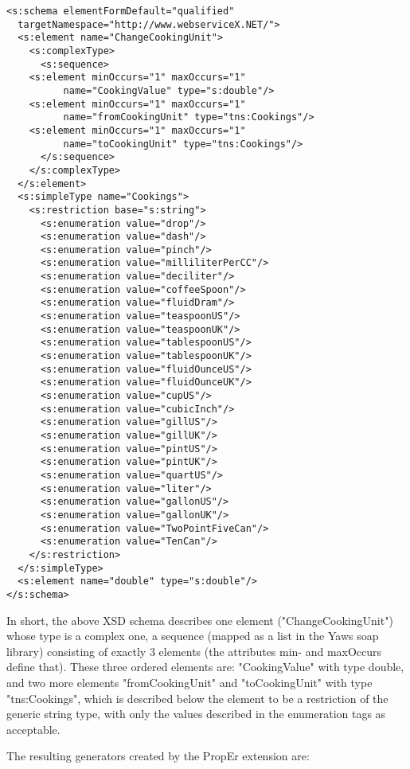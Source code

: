 \documentclass[11pt]{article} %
\begin{document}
\begin{lstlisting}
<s:schema elementFormDefault="qualified"
  targetNamespace="http://www.webserviceX.NET/">
  <s:element name="ChangeCookingUnit">
    <s:complexType>
      <s:sequence>
	<s:element minOccurs="1" maxOccurs="1" 
          name="CookingValue" type="s:double"/>
	<s:element minOccurs="1" maxOccurs="1"
          name="fromCookingUnit" type="tns:Cookings"/>
	<s:element minOccurs="1" maxOccurs="1" 
          name="toCookingUnit" type="tns:Cookings"/>
      </s:sequence>
    </s:complexType>
  </s:element>
  <s:simpleType name="Cookings">
    <s:restriction base="s:string">
      <s:enumeration value="drop"/>
      <s:enumeration value="dash"/>
      <s:enumeration value="pinch"/>
      <s:enumeration value="milliliterPerCC"/>
      <s:enumeration value="deciliter"/>
      <s:enumeration value="coffeeSpoon"/>
      <s:enumeration value="fluidDram"/>
      <s:enumeration value="teaspoonUS"/>
      <s:enumeration value="teaspoonUK"/>
      <s:enumeration value="tablespoonUS"/>
      <s:enumeration value="tablespoonUK"/>
      <s:enumeration value="fluidOunceUS"/>
      <s:enumeration value="fluidOunceUK"/>
      <s:enumeration value="cupUS"/>
      <s:enumeration value="cubicInch"/>
      <s:enumeration value="gillUS"/>
      <s:enumeration value="gillUK"/>
      <s:enumeration value="pintUS"/>
      <s:enumeration value="pintUK"/>
      <s:enumeration value="quartUS"/>
      <s:enumeration value="liter"/>
      <s:enumeration value="gallonUS"/>
      <s:enumeration value="gallonUK"/>
      <s:enumeration value="TwoPointFiveCan"/>
      <s:enumeration value="TenCan"/>
    </s:restriction>
  </s:simpleType>
  <s:element name="double" type="s:double"/>
</s:schema>

\end{lstlisting}

In short, the above XSD schema describes one element ("ChangeCookingUnit") whose type is a complex one, a sequence (mapped as a list in the Yaws soap library) consisting of exactly 3 elements (the attributes min- and maxOccurs define that). These three ordered elements are: "CookingValue" with type double, and two more elements "fromCookingUnit" and "toCookingUnit" with type "tns:Cookings", which is described below the element to be a restriction of the generic string type, with only the values described in the enumeration tags as acceptable. 

The resulting generators created by the PropEr extension are:
\end{document}
